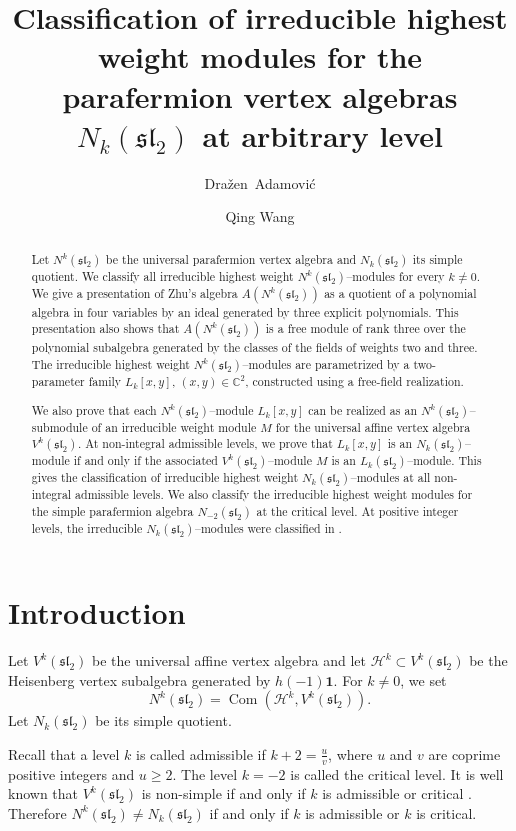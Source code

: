 \documentclass[11 pt]{amsart}
\title[Classification of   irreducible $N_k(\mathfrak{sl}_2)$--modules] {Classification of irreducible highest weight modules for the parafermion vertex algebras   $N_k(\mathfrak{sl}_2)$ at arbitrary level}
\author[Dra\v zen Adamovi\'c]{Dra{\v z}en~Adamovi\'c}
\author[Qing Wang]{ Qing Wang}
\date{}
\theoremstyle{definition}
\theoremstyle{plain}
\begin{document}
\begin{abstract}
Let $N^k(\mathfrak{sl}_2)$ be the universal parafermion vertex algebra
and $N_k(\mathfrak{sl}_2)$ its simple quotient.
We classify all irreducible highest weight
$N^k(\mathfrak{sl}_2)$--modules for every $k\neq0$.
We give a presentation of Zhu's algebra
$A(N^k(\mathfrak{sl}_2))$ as a quotient of a polynomial algebra in
four variables by an ideal generated by three explicit polynomials.
This presentation also shows that $A(N^k(\mathfrak{sl}_2))$ is a free
module of rank three over the polynomial subalgebra generated by the
classes of the fields of weights two and three.
The irreducible highest weight $N^k(\mathfrak{sl}_2)$--modules are
parametrized by a two-parameter family $L_k[x,y]$,
$(x,y)\in\mathbb C^2$, constructed using a free-field realization.

We also prove that each $N^k(\mathfrak{sl}_2)$--module $L_k[x,y]$
can be realized as an $N^k(\mathfrak{sl}_2)$--submodule of an
irreducible weight module $M$ for the universal affine vertex algebra
$V^k(\mathfrak{sl}_2)$.
At non-integral  admissible levels, we prove that $L_k[x,y]$ is an
$N_k(\mathfrak{sl}_2)$--module if and only if the associated
$V^k(\mathfrak{sl}_2)$--module $M$ is an
$L_k(\mathfrak{sl}_2)$--module.
This gives the classification of irreducible highest weight
$N_k(\mathfrak{sl}_2)$--modules at all non-integral admissible levels.
We also classify the irreducible highest weight modules for the simple
parafermion algebra $N_{-2}(\mathfrak{sl}_2)$ at the critical level.
At positive integer levels, the irreducible
$N_k(\mathfrak{sl}_2)$--modules were classified in \cite{ALY}.
\end{abstract}

\maketitle


\section{Introduction}
Let $V^k(\mathfrak{sl}_2)$ be the universal affine vertex algebra and
let $\mathcal H^k\subset V^k(\mathfrak{sl}_2)$ be the Heisenberg
vertex subalgebra generated by $h(-1)\mathbf 1$. For $k\neq0$, we set
\[
  N^k(\mathfrak{sl}_2)
  =\operatorname{Com}(\mathcal H^k,V^k(\mathfrak{sl}_2)).
\]
Let $N_k(\mathfrak{sl}_2)$ be its simple quotient.

Recall that a level $k$ is called admissible if
$k+2=\frac{u}{v}$, where $u$ and $v$ are coprime positive integers
and $u\geq2$. The level $k=-2$ is called the critical level. It is
well known that $V^k(\mathfrak{sl}_2)$ is non-simple if and only if
$k$ is admissible or critical  \cite{GK}.   Therefore
$
N^k(\mathfrak{sl}_2)\neq N_k(\mathfrak{sl}_2)
$
if and only if $k$ is admissible or $k$ is critical.
\end{document}
